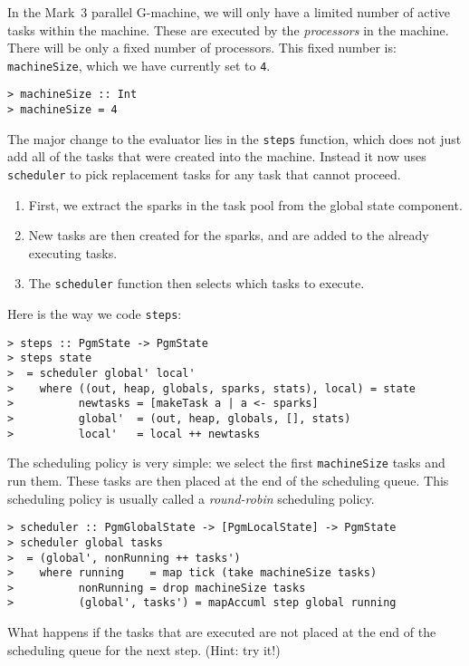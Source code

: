 In the Mark~3 parallel G-machine, we will only have a limited number
of active tasks within the machine. These are executed by the {\em
processors\/} in the machine. There will be only a
fixed number of processors. This fixed number is: \mbox{\tt machineSize}, which
we have currently set to \mbox{\tt 4}.
\begin{verbatim}
> machineSize :: Int
> machineSize = 4
\end{verbatim}
%
%
\par
The major change to the evaluator lies in the \mbox{\tt steps} function, which
does not just add all of the tasks that were created into the machine.
Instead it now uses \mbox{\tt scheduler} to pick replacement tasks for any task
that cannot proceed.
\begin{enumerate}
\item First, we extract the sparks in the task pool from the global
state component.
\item New tasks are then created for the sparks, and are added to
the already executing tasks.
\item The \mbox{\tt scheduler} function then selects which tasks to execute.
\end{enumerate}

Here is the way we code \mbox{\tt steps}:
\begin{verbatim}
> steps :: PgmState -> PgmState
> steps state
>  = scheduler global' local'
>    where ((out, heap, globals, sparks, stats), local) = state
>          newtasks = [makeTask a | a <- sparks]
>          global'  = (out, heap, globals, [], stats)
>          local'   = local ++ newtasks
\end{verbatim}
%
%
\par
The scheduling policy is very simple: we select the first
\mbox{\tt machineSize} tasks and run them. These tasks are then placed at the
end of the scheduling queue. This scheduling policy is usually called
a {\em round-robin\/} scheduling
policy.
\begin{verbatim}
> scheduler :: PgmGlobalState -> [PgmLocalState] -> PgmState
> scheduler global tasks
>  = (global', nonRunning ++ tasks')
>    where running    = map tick (take machineSize tasks)
>          nonRunning = drop machineSize tasks
>          (global', tasks') = mapAccuml step global running
\end{verbatim}
%
%
\begin{exercise}\label{pgm:X:sched1}
What happens if the tasks that are executed are not placed at the end
of the scheduling queue for the next step. (Hint: try it!)
\end{exercise}

